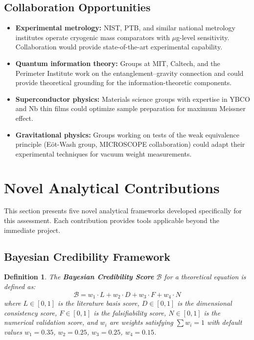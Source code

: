 \documentclass[11pt,a4paper]{article}
\newtheorem{definition}{Definition}
\begin{document}
\subsection{Collaboration Opportunities}

\begin{itemize}[leftmargin=1.5em]
  \item \textbf{Experimental metrology:} NIST, PTB, and similar national metrology institutes operate cryogenic mass comparators with $\mu$g-level sensitivity. Collaboration would provide state-of-the-art experimental capability.
  \item \textbf{Quantum information theory:} Groups at MIT, Caltech, and the Perimeter Institute work on the entanglement--gravity connection and could provide theoretical grounding for the information-theoretic components.
  \item \textbf{Superconductor physics:} Materials science groups with expertise in YBCO and Nb thin films could optimize sample preparation for maximum Meissner effect.
  \item \textbf{Gravitational physics:} Groups working on tests of the weak equivalence principle (E\"ot-Wash group, MICROSCOPE collaboration) could adapt their experimental techniques for vacuum weight measurements.
\end{itemize}

\section{Novel Analytical Contributions}

This section presents five novel analytical frameworks developed specifically for this assessment. Each contribution provides tools applicable beyond the immediate project.

\subsection{Bayesian Credibility Framework}

\begin{definition}
The \textbf{Bayesian Credibility Score} $\mathcal{B}$ for a theoretical equation is defined as:
\begin{equation}
  \mathcal{B} = w_1 \cdot L + w_2 \cdot D + w_3 \cdot F + w_4 \cdot N
  \label{eq:bayesian_score}
\end{equation}
where $L \in [0,1]$ is the literature basis score, $D \in [0,1]$ is the dimensional consistency score, $F \in [0,1]$ is the falsifiability score, $N \in [0,1]$ is the numerical validation score, and $w_i$ are weights satisfying $\sum w_i = 1$ with default values $w_1 = 0.35$, $w_2 = 0.25$, $w_3 = 0.25$, $w_4 = 0.15$.
\end{definition}
\end{document}
